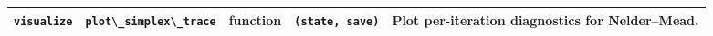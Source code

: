 \documentclass[
  10pt,
]{article}
\newcommand{\passthrough}[1]{#1}
\begin{document}
\begin{longtable}[]{@{}lllll@{}}
\begin{minipage}[t]{0.17\columnwidth}
\passthrough{\lstinline!visualize!}\strut
\end{minipage} & \begin{minipage}[t]{0.17\columnwidth}\raggedright
\passthrough{\lstinline!plot\_simplex\_trace!}\strut
\end{minipage} & \begin{minipage}[t]{0.17\columnwidth}\raggedright
function\strut
\end{minipage} & \begin{minipage}[t]{0.17\columnwidth}\raggedright
\passthrough{\lstinline!(state, save)!}\strut
\end{minipage} & \begin{minipage}[t]{0.17\columnwidth}\raggedright
Plot per-iteration diagnostics for Nelder--Mead.\strut
\end{minipage}\tabularnewline
\bottomrule
\end{longtable}
\end{document}
